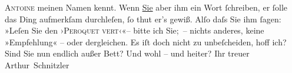 \begin{ledgroupsized}[t]{13cm}
                  \textsc{Antoine} meinen Namen kennt. Wenn \uline{Sie} aber ihm ein {\pb}Wort ſchreiben, er ſolle das Ding aufmerkſam
               durchleſen, ſo thut er’s gewiß. Alſo daſs Sie ihm ſagen: »Leſen Sie den ›\textsc{Peroquet vert}‹«– bitte ich Sie; – nichts anderes, keine »Empfehlung« – oder dergleichen.\pend
           \pstart
           Es iſt doch nicht zu unbeſcheiden, hoff ich?\pend
           \pstart
           Sind Sie nun endlich außer Bett? Und wohl – und heiter? Ihr treuer \spacefill\mbox{Arthur
                  Schnitzler}\pend
           
         
         \endnumbering{}\end{ledgroupsized}  \newcommand{\dateiname}{L00923}\newcommand{\titel}{Arthur Schnitzler an Georg Brandes, 8. 6. 1899}\newcommand{\editorInnen}{Martin Anton Müller und Gerd-Hermann Susen}
      